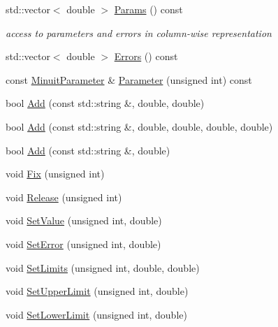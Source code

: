\begin{DoxyCompactItemize}
std\+::vector$<$ double $>$ \mbox{\hyperlink{classROOT_1_1Minuit2_1_1MnUserTransformation_a85477022b0cfb39ccfe69a46cdaffe73}{Params}} () const
\begin{DoxyCompactList}\small\item\em access to parameters and errors in column-\/wise representation \end{DoxyCompactList}\item 
std\+::vector$<$ double $>$ \mbox{\hyperlink{classROOT_1_1Minuit2_1_1MnUserTransformation_a7920b97096b486b27a4a020894677500}{Errors}} () const
\item 
const \mbox{\hyperlink{classROOT_1_1Minuit2_1_1MinuitParameter}{Minuit\+Parameter}} \& \mbox{\hyperlink{classROOT_1_1Minuit2_1_1MnUserTransformation_ae82c0c5c67cd7e5112906a88d1ee5813}{Parameter}} (unsigned int) const
\item 
bool \mbox{\hyperlink{classROOT_1_1Minuit2_1_1MnUserTransformation_a2ddcd7b0cc5234b386407d7a76db1720}{Add}} (const std\+::string \&, double, double)
\item 
bool \mbox{\hyperlink{classROOT_1_1Minuit2_1_1MnUserTransformation_a173dea97b7be768e54b669c53b92c2dc}{Add}} (const std\+::string \&, double, double, double, double)
\item 
bool \mbox{\hyperlink{classROOT_1_1Minuit2_1_1MnUserTransformation_acf1aa6f4f5c65405a3b9e700ae806e44}{Add}} (const std\+::string \&, double)
\item 
void \mbox{\hyperlink{classROOT_1_1Minuit2_1_1MnUserTransformation_ad3447936f5ae547aa3f80a76efa5e35d}{Fix}} (unsigned int)
\item 
void \mbox{\hyperlink{classROOT_1_1Minuit2_1_1MnUserTransformation_acc0c7437f21dc53d1d56d62f7a82d352}{Release}} (unsigned int)
\item 
void \mbox{\hyperlink{classROOT_1_1Minuit2_1_1MnUserTransformation_a62f598ff8d0c916c496f495440101d9c}{Set\+Value}} (unsigned int, double)
\item 
void \mbox{\hyperlink{classROOT_1_1Minuit2_1_1MnUserTransformation_a6256d78c2aafb1142eadc811ee981d79}{Set\+Error}} (unsigned int, double)
\item 
void \mbox{\hyperlink{classROOT_1_1Minuit2_1_1MnUserTransformation_ad45b1ae620fbf8ca9f77846b80cca808}{Set\+Limits}} (unsigned int, double, double)
\item 
void \mbox{\hyperlink{classROOT_1_1Minuit2_1_1MnUserTransformation_a276c83d584ef857cd2b69ecc04cfab01}{Set\+Upper\+Limit}} (unsigned int, double)
\item 
void \mbox{\hyperlink{classROOT_1_1Minuit2_1_1MnUserTransformation_a380498bdd8801393713fde4a4835402e}{Set\+Lower\+Limit}} (unsigned int, double)

\end{DoxyCompactItemize}
